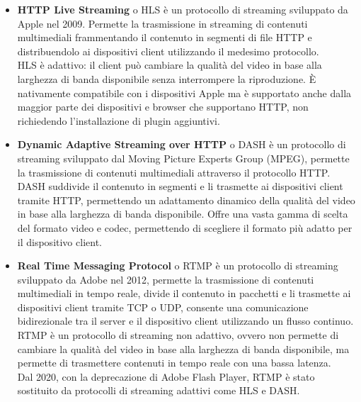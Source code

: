 \begin{itemize}

    \item \textbf{HTTP Live Streaming} o HLS è un protocollo di streaming sviluppato da Apple nel 2009. Permette la trasmissione in streaming di contenuti multimediali frammentando il contenuto in segmenti di file HTTP e distribuendolo ai dispositivi client utilizzando il medesimo protocollo.\\
    HLS è adattivo: il client può cambiare la qualità del video in base alla larghezza di banda disponibile senza interrompere la riproduzione.
    È nativamente compatibile con i dispositivi Apple ma è supportato anche dalla maggior parte dei dispositivi e browser che supportano HTTP, non richiedendo l'installazione di plugin aggiuntivi.\\

    \item \textbf{Dynamic Adaptive Streaming over HTTP} o DASH è un protocollo di streaming sviluppato dal Moving Picture Experts Group (MPEG), permette la trasmissione di contenuti multimediali
    attraverso il protocollo HTTP.\\
    DASH suddivide il contenuto in segmenti e li trasmette ai dispositivi client tramite HTTP, permettendo un adattamento dinamico della qualità del video in base alla larghezza di banda disponibile.
    Offre una vasta gamma di scelta del formato video e codec, permettendo di scegliere il formato più adatto per il dispositivo client.\\

    \item \textbf{Real Time Messaging Protocol} o RTMP è un protocollo di streaming sviluppato da Adobe nel 2012, permette la trasmissione di contenuti multimediali in tempo reale,
    divide il contenuto in pacchetti e li trasmette ai dispositivi client tramite TCP o UDP, consente una comunicazione bidirezionale tra il server e il dispositivo client utilizzando un flusso continuo.\\
    RTMP è un protocollo di streaming non adattivo, ovvero non permette di cambiare la qualità del video in base alla larghezza di banda disponibile, ma permette di 
    trasmettere contenuti in tempo reale con una bassa latenza.\\
    Dal 2020, con la deprecazione di Adobe Flash Player, RTMP è stato sostituito da protocolli di streaming adattivi come HLS e DASH.\\
    \end{itemize}

